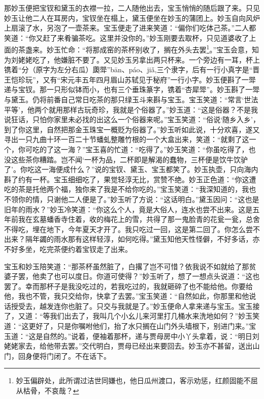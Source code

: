 \documentclass[12pt,oneside]{book}
\begin{document}
那妙玉便把宝钗和黛玉的衣襟一拉，二人随他出去，宝玉悄悄的随后跟了来。只见妙玉让他二人在耳房内，宝钗坐在榻上，黛玉便坐在妙玉的蒲团上。妙玉自向风炉上扇滚了水，另泡了一壶茶来。宝玉便走了进来笑道：“偏你们吃体己茶。”二人都笑道：“你又赶了来肴骗茶吃。这里并没你的。”妙玉刚要去取杯，只见道婆收了上面的茶盏来。妙玉忙命：“将那成窑的茶杯别收了，搁在外头去罢\footnote{妙玉偏辟处，此所谓过洁世同嫌也，他日瓜州渡口，客示劝惩，红颜固能不屈从枯骨，不哀哉？}。”宝玉会意，知为刘姥姥吃了，他嫌脏不要了。又见妙玉另拿出两只杯来。一个旁边有一耳，杯上镌着“分（原字为左分右瓜）瓟斝”bān、páo、jiǎ,三个隶字，后有一行小真字是“晋王恺珍玩”，又有“宋元丰五年四月眉山苏轼见于秘府”一行小字。妙玉便斟了一斝递与宝钗。那一只形似钵而小，也有三个垂珠篆字，镌着“杏犀斝”。妙玉斟了一斝与黛玉。仍将前番自己常日吃茶的那只绿玉斗来斟与宝玉。宝玉笑道：“常言‘世法平等’，他两个就用那样古玩奇珍，我就是个俗器了。”妙玉道：“这是俗器？不是我说狂话，只怕你家里未必找的出这么一个俗器来呢。”宝玉笑道：“俗说‘随乡入乡’，到了你这里，自然把那金玉珠宝一概贬为俗器了。”妙玉听如此说，十分欢喜，遂又寻出一只九曲十环一百二十节蟠虬整雕竹根的一个大盒出来，笑道：“就剩了这一个，你可吃的了这一海？”宝玉喜的忙道：“吃得了。”妙玉笑道：“你虽吃得了，也没这些茶你糟踏。岂不闻‘一杯为品，二杯即是解渴的蠢物，三杯便是饮牛饮驴了’。你吃这一海便成什么？”说的宝钗、黛玉、宝玉都笑了。妙玉执壶，只向海内斟了约有一杯。宝玉细细吃了，果觉轻淳无比，赏赞不绝。妙玉正色道：“你这遭吃的茶是托他两个福，独你来了我是不给你吃的。”宝玉笑道：“我深知道的，我也不领你的情，只谢他二人便是了。”妙玉听了方说：“这话明白。”黛玉因问：“这也是旧年的雨水？”妙玉冷笑道：“你这么个人，竟是大俗人，连水也尝不出来。这是五年前我在玄墓蟠香寺住着，收的梅花上的雪，共得了那一鬼脸青的花瓮一瓮，总舍不得吃，埋在地下，今年夏天才开了。我只吃过一回，这是第二回了。你怎么尝不出来？隔年蠲的雨水那有这样轻淳，如何吃得。”黛玉知他天性怪僻，不好多话，亦不好多坐，吃完茶便约着宝钗走了出来。

宝玉和妙玉陪笑道：“那茶杯虽然脏了，白撂了岂不可惜？依我说不如就给了那贫婆子罢，他卖了也可以度日。你道可使得？”妙玉听了，想了一想点头说道：“这也罢了。幸而那杯子是我没吃过的，若我吃过的，我就砸碎了也不能给他。你要给他，我也不管，我只交给你，快拿了去罢。”宝玉笑道：“自然如此，你那里和他说话授受去，越发连你也脏了。只交与我就是了。”妙玉便命人拿来递与宝玉。宝玉接了，又道：“等我们出去了，我叫几个小幺儿来河里打几桶水来洗地如何？”妙玉笑道：“这更好了，只是你嘱咐他们，抬了水只搁在山门外头墙根下，别进门来。”宝玉道：“这是自然的。”说着，便袖着那杯，递与贾母房中小丫头拿着，说：“明日刘姥姥家去，给他带去罢。”交代明白，贾母已经出来要回去。妙玉亦不甚留，送出山门，回身便将门闭了。不在话下。
\end{document}
